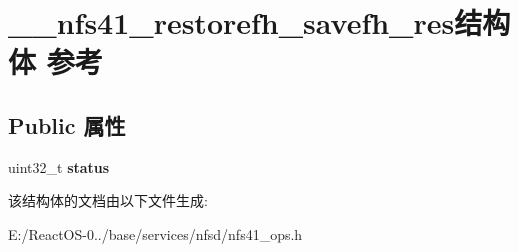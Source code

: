 \hypertarget{struct____nfs41__restorefh__savefh__res}{}\section{\+\_\+\+\_\+nfs41\+\_\+restorefh\+\_\+savefh\+\_\+res结构体 参考}
\label{struct____nfs41__restorefh__savefh__res}
\subsection*{Public 属性}
\begin{DoxyCompactItemize}
\item 
\mbox{\label{struct____nfs41__restorefh__savefh__res_a51fbd7cc11b9fcda514f97bec2921391}} 
uint32\+\_\+t {\bfseries status}
\end{DoxyCompactItemize}


该结构体的文档由以下文件生成\+:\begin{DoxyCompactItemize}
\item 
E\+:/\+React\+O\+S-\/0../base/services/nfsd/nfs41\+\_\+ops.\+h\end{DoxyCompactItemize}
